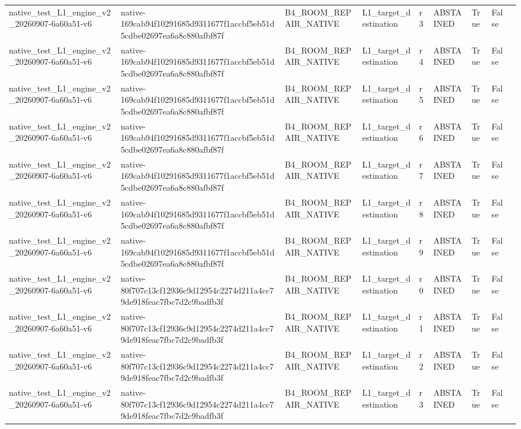 \begin{tabular}{lllllllll}
native\_test\_L1\_engine\_v2\_20260907-6a60a51-v6 & native-169cab94f10291685d9311677f1accbf5eb51d5cdbe02697ea6a8c880afbf87f & B4\_ROOM\_REPAIR\_NATIVE & L1\_target\_destination & r3 & ABSTAINED & True & False &  \\
native\_test\_L1\_engine\_v2\_20260907-6a60a51-v6 & native-169cab94f10291685d9311677f1accbf5eb51d5cdbe02697ea6a8c880afbf87f & B4\_ROOM\_REPAIR\_NATIVE & L1\_target\_destination & r4 & ABSTAINED & True & False &  \\
native\_test\_L1\_engine\_v2\_20260907-6a60a51-v6 & native-169cab94f10291685d9311677f1accbf5eb51d5cdbe02697ea6a8c880afbf87f & B4\_ROOM\_REPAIR\_NATIVE & L1\_target\_destination & r5 & ABSTAINED & True & False &  \\
native\_test\_L1\_engine\_v2\_20260907-6a60a51-v6 & native-169cab94f10291685d9311677f1accbf5eb51d5cdbe02697ea6a8c880afbf87f & B4\_ROOM\_REPAIR\_NATIVE & L1\_target\_destination & r6 & ABSTAINED & True & False &  \\
native\_test\_L1\_engine\_v2\_20260907-6a60a51-v6 & native-169cab94f10291685d9311677f1accbf5eb51d5cdbe02697ea6a8c880afbf87f & B4\_ROOM\_REPAIR\_NATIVE & L1\_target\_destination & r7 & ABSTAINED & True & False &  \\
native\_test\_L1\_engine\_v2\_20260907-6a60a51-v6 & native-169cab94f10291685d9311677f1accbf5eb51d5cdbe02697ea6a8c880afbf87f & B4\_ROOM\_REPAIR\_NATIVE & L1\_target\_destination & r8 & ABSTAINED & True & False &  \\
native\_test\_L1\_engine\_v2\_20260907-6a60a51-v6 & native-169cab94f10291685d9311677f1accbf5eb51d5cdbe02697ea6a8c880afbf87f & B4\_ROOM\_REPAIR\_NATIVE & L1\_target\_destination & r9 & ABSTAINED & True & False &  \\
native\_test\_L1\_engine\_v2\_20260907-6a60a51-v6 & native-80f707c13cf12936c9d12954c2274d211a4cc79de918feac7fbc7d2c9badfb3f & B4\_ROOM\_REPAIR\_NATIVE & L1\_target\_destination & r0 & ABSTAINED & True & False &  \\
native\_test\_L1\_engine\_v2\_20260907-6a60a51-v6 & native-80f707c13cf12936c9d12954c2274d211a4cc79de918feac7fbc7d2c9badfb3f & B4\_ROOM\_REPAIR\_NATIVE & L1\_target\_destination & r1 & ABSTAINED & True & False &  \\
native\_test\_L1\_engine\_v2\_20260907-6a60a51-v6 & native-80f707c13cf12936c9d12954c2274d211a4cc79de918feac7fbc7d2c9badfb3f & B4\_ROOM\_REPAIR\_NATIVE & L1\_target\_destination & r2 & ABSTAINED & True & False &  \\
native\_test\_L1\_engine\_v2\_20260907-6a60a51-v6 & native-80f707c13cf12936c9d12954c2274d211a4cc79de918feac7fbc7d2c9badfb3f & B4\_ROOM\_REPAIR\_NATIVE & L1\_target\_destination & r3 & ABSTAINED & True & False &  \\

\end{tabular}
